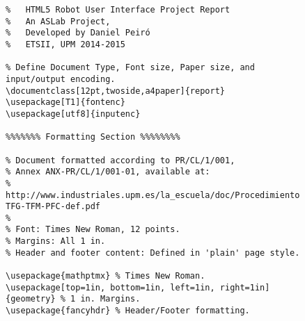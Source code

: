   \begin{figure}[H]
  
  \captionsetup{justification=centering}
  \begin{verbatim}
%   HTML5 Robot User Interface Project Report
%   An ASLab Project,
%   Developed by Daniel Peiró
%   ETSII, UPM 2014-2015

% Define Document Type, Font size, Paper size, and input/output encoding.
\documentclass[12pt,twoside,a4paper]{report}
\usepackage[T1]{fontenc} 
\usepackage[utf8]{inputenc}

%%%%%%% Formatting Section %%%%%%%%

% Document formatted according to PR/CL/1/001,
% Annex ANX-PR/CL/1/001-01, available at:
% http://www.industriales.upm.es/la_escuela/doc/Procedimiento-TFG-TFM-PFC-def.pdf
%
% Font: Times New Roman, 12 points.
% Margins: All 1 in.
% Header and footer content: Defined in 'plain' page style. 

\usepackage{mathptmx} % Times New Roman.
\usepackage[top=1in, bottom=1in, left=1in, right=1in]{geometry} % 1 in. Margins.
\usepackage{fancyhdr} % Header/Footer formatting.
  \end{verbatim}
  \end{figure}
